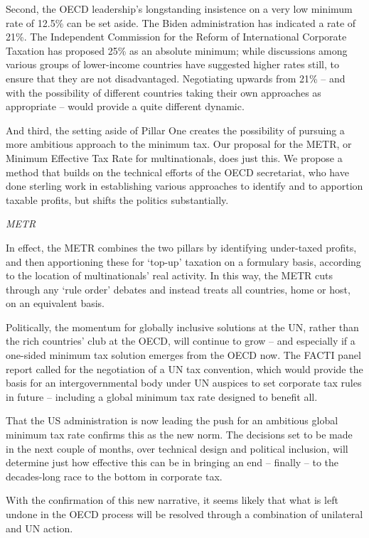 \documentclass[
]{book}
\begin{document}
Second, the OECD leadership's longstanding insistence on a very low minimum rate of 12.5\% can be set aside. The Biden administration has indicated a rate of 21\%. The Independent Commission for the Reform of International Corporate Taxation has proposed 25\% as an absolute minimum; while discussions among various groups of lower-income countries have suggested higher rates still, to ensure that they are not disadvantaged. Negotiating upwards from 21\% -- and with the possibility of different countries taking their own approaches as appropriate -- would provide a quite different dynamic.

And third, the setting aside of Pillar One creates the possibility of pursuing a more ambitious approach to the minimum tax. Our proposal for the METR, or Minimum Effective Tax Rate for multinationals, does just this. We propose a method that builds on the technical efforts of the OECD secretariat, who have done sterling work in establishing various approaches to identify and to apportion taxable profits, but shifts the politics substantially.

\emph{METR}

In effect, the METR combines the two pillars by identifying under-taxed profits, and then apportioning these for `top-up' taxation on a formulary basis, according to the location of multinationals' real activity. In this way, the METR cuts through any `rule order' debates and instead treats all countries, home or host, on an equivalent basis.

Politically, the momentum for globally inclusive solutions at the UN, rather than the rich countries' club at the OECD, will continue to grow -- and especially if a one-sided minimum tax solution emerges from the OECD now. The FACTI panel report called for the negotiation of a UN tax convention, which would provide the basis for an intergovernmental body under UN auspices to set corporate tax rules in future -- including a global minimum tax rate designed to benefit all.

That the US administration is now leading the push for an ambitious global minimum tax rate confirms this as the new norm. The decisions set to be made in the next couple of months, over technical design and political inclusion, will determine just how effective this can be in bringing an end -- finally -- to the decades-long race to the bottom in corporate tax.

With the confirmation of this new narrative, it seems likely that what is left undone in the OECD process will be resolved through a combination of unilateral and UN action.
\end{document}
